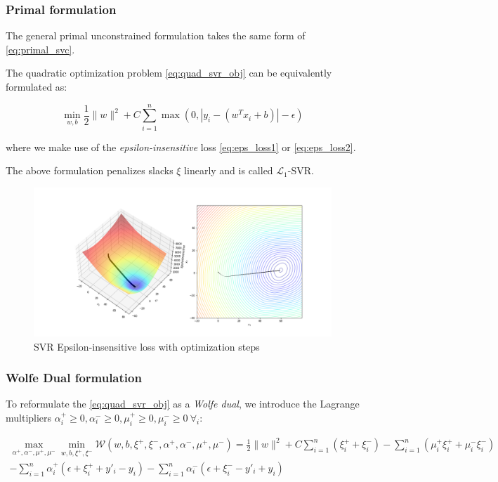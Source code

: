 \subsubsection{Primal formulation}

The general primal unconstrained formulation takes the same form of \ref{eq:primal_svc}.

The quadratic optimization problem \ref{eq:quad_svr_obj} can be equivalently formulated as: 

\begin{equation} \label{eq:svr_eps}
	\min_{w,b} \frac{1}{2} \| w \|^2 + C \sum_{i=1}^n \max(0, |y_i - (w^T x_i + b)| - \epsilon)
\end{equation}

where we make use of the \emph{epsilon-insensitive} loss \ref{eq:eps_loss1} or \ref{eq:eps_loss2}.

The above formulation penalizes slacks $\xi$ linearly and is called $\mathcal{L}_1$-SVR.

\begin{figure}[h!]
	\centering
  	\includegraphics[scale=0.4]{img/svr_eps_loss.png}
  	\caption{SVR Epsilon-insensitive loss with optimization steps}
  	\label{fig:svr_eps_loss}
\end{figure}

\subsubsection{Wolfe Dual formulation}

To reformulate the \ref{eq:quad_svr_obj} as a \emph{Wolfe dual}, we introduce the Lagrange multipliers $\alpha_i^+ \geq 0, \alpha_i^- \geq 0, \mu_i^+ \geq 0, \mu_i^- \geq 0 \ \forall_i$:

\begin{equation} \label{eq:svr_wolfe_dual}
	\begin{aligned}
    	\max_{\alpha^+,\alpha^-,\mu^+,\mu^-} \min_{w,b,\xi^+,\xi^-} \mathcal{W}(w,b,\xi^+,\xi^-,\alpha^+,\alpha^-,\mu^+,\mu^-) = \frac{1}{2} \| w \|^2 + C \sum_{i=1}^n (\xi_i^+ + \xi_i^-)-\sum_{i=1}^n (\mu_i^+ \xi_i^+ + \mu_i^- \xi_i^-) \\ -\sum_{i=1}^n \alpha_i^+(\epsilon+\xi_i^+ + y'_i-y_i)-\sum_{i=1}^n \alpha_i^-(\epsilon+\xi_i^- - y'_i+y_i)
	\end{aligned}
\end{equation}

